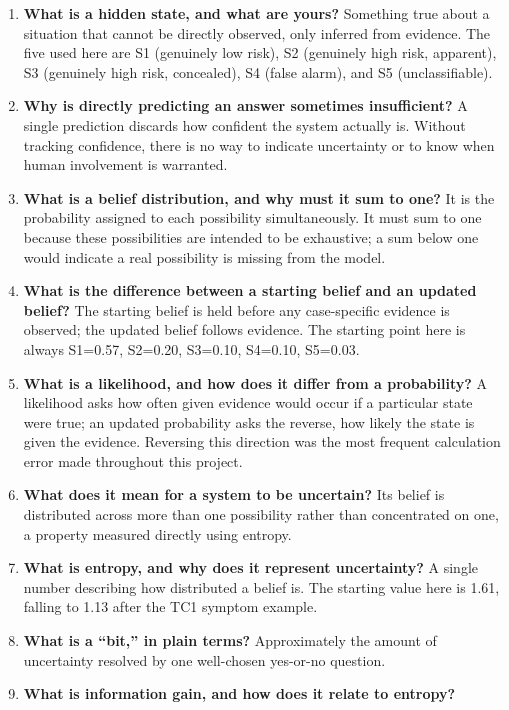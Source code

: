 \documentclass{article}
\begin{document}
\begin{enumerate}
\def\labelenumi{\arabic{enumi}.}
\item
  \textbf{What is a hidden state, and what are yours?} Something true
  about a situation that cannot be directly observed, only inferred from
  evidence. The five used here are S1 (genuinely low risk), S2
  (genuinely high risk, apparent), S3 (genuinely high risk, concealed),
  S4 (false alarm), and S5 (unclassifiable).
\item
  \textbf{Why is directly predicting an answer sometimes insufficient?}
  A single prediction discards how confident the system actually is.
  Without tracking confidence, there is no way to indicate uncertainty
  or to know when human involvement is warranted.
\item
  \textbf{What is a belief distribution, and why must it sum to one?} It
  is the probability assigned to each possibility simultaneously. It
  must sum to one because these possibilities are intended to be
  exhaustive; a sum below one would indicate a real possibility is
  missing from the model.
\item
  \textbf{What is the difference between a starting belief and an
  updated belief?} The starting belief is held before any case-specific
  evidence is observed; the updated belief follows evidence. The
  starting point here is always S1=0.57, S2=0.20, S3=0.10, S4=0.10,
  S5=0.03.
\item
  \textbf{What is a likelihood, and how does it differ from a
  probability?} A likelihood asks how often given evidence would occur
  if a particular state were true; an updated probability asks the
  reverse, how likely the state is given the evidence. Reversing this
  direction was the most frequent calculation error made throughout this
  project.
\item
  \textbf{What does it mean for a system to be uncertain?} Its belief is
  distributed across more than one possibility rather than concentrated
  on one, a property measured directly using entropy.
\item
  \textbf{What is entropy, and why does it represent uncertainty?} A
  single number describing how distributed a belief is. The starting
  value here is 1.61, falling to 1.13 after the TC1 symptom example.
\item
  \textbf{What is a ``bit,'' in plain terms?} Approximately the amount
  of uncertainty resolved by one well-chosen yes-or-no question.
\item
  \textbf{What is information gain, and how does it relate to entropy?}

\end{enumerate}
\end{document}
